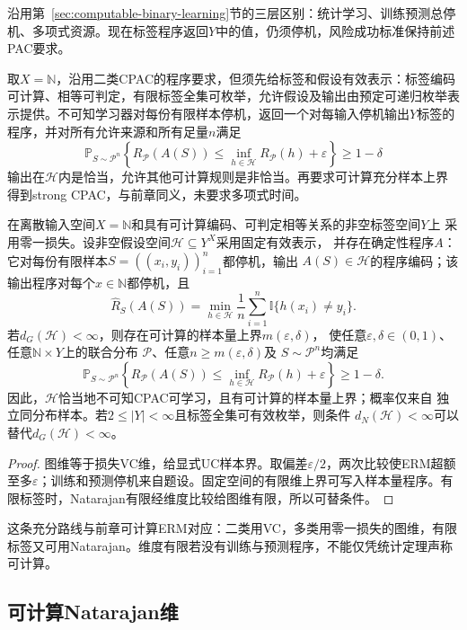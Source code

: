 沿用第~\ref{sec:computable-binary-learning}节的三层区别：统计学习、训练预测总停机、多项式资源。现在标签程序返回$Y$中的值，仍须停机，风险成功标准保持前述PAC要求。

取$X=\mathbb N$，沿用二类CPAC的程序要求，但须先给标签和假设有效表示：标签编码可计算、相等可判定，有限标签全集可枚举，允许假设及输出由预定可递归枚举表示提供。不可知学习器对每份有限样本停机，返回一个对每输入停机输出$Y$标签的程序，并对所有允许来源和所有足量$n$满足
\[
 \mathbb P_{S\sim\mathcal P^n}\!\left\{
 R_{\mathcal P}(A(S))\leq\inf_{h\in\mathcal H}R_{\mathcal P}(h)+\varepsilon
 \right\}\geq1-\delta
\]
输出在$\mathcal H$内是恰当，允许其他可计算规则是非恰当。再要求可计算充分样本上界得到strong CPAC，与前章同义，未要求多项式时间。

\begin{theorem}[多分类可计算ERM的充分条件]
\label{thm:multiclass-computable-erm}
在离散输入空间$X=\mathbb N$和具有可计算编码、可判定相等关系的非空标签空间$Y$上
采用零一损失。设非空假设空间$\mathcal H\subseteq Y^X$采用固定有效表示，
并存在确定性程序$A$：它对每份有限样本$S=((x_i,y_i))_{i=1}^n$都停机，输出
$A(S)\in\mathcal H$的程序编码；该输出程序对每个$x\in\mathbb N$都停机，且
\[
 \hat R_S(A(S))
 =\min_{h\in\mathcal H}\frac1n\sum_{i=1}^n\mathbb I\{h(x_i)\neq y_i\}.
\]
若$d_G(\mathcal H)<\infty$，则存在可计算的样本量上界$m(\varepsilon,\delta)$，
使任意$\varepsilon,\delta\in(0,1)$、任意$\mathbb N\times Y$上的联合分布
$\mathcal P$、任意$n\geq m(\varepsilon,\delta)$及
$S\sim\mathcal P^n$均满足
\[
 \mathbb P_{S\sim\mathcal P^n}\left\{
 R_{\mathcal P}(A(S))
 \leq\inf_{h\in\mathcal H}R_{\mathcal P}(h)+\varepsilon
 \right\}\geq1-\delta.
\]
因此，$\mathcal H$恰当地不可知CPAC可学习，且有可计算的样本量上界；概率仅来自
独立同分布样本。若$2\leq|Y|<\infty$且标签全集可有效枚举，则条件
$d_N(\mathcal H)<\infty$可以替代$d_G(\mathcal H)<\infty$。
\end{theorem}

\begin{proof}
图维等于损失VC维，给显式UC样本界。取偏差$\varepsilon/2$，两次比较使ERM超额至多$\varepsilon$；训练和预测停机来自题设。固定空间的有限维上界可写入样本量程序。有限标签时，Natarajan有限经维度比较给图维有限，所以可替条件。
\end{proof}

这条充分路线与前章可计算ERM对应：二类用VC，多类用零一损失的图维，有限标签又可用Natarajan。维度有限若没有训练与预测程序，不能仅凭统计定理声称可计算。

\subsection{可计算Natarajan维}

